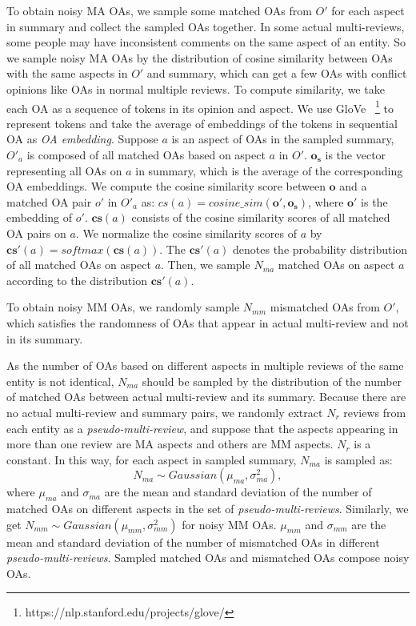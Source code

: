 To obtain noisy MA OAs, 
we sample some matched OAs from $O'$ for each aspect in summary and collect the sampled OAs together.
In some actual multi-reviews, some people may have inconsistent comments on the same aspect of an entity.
So we sample noisy MA OAs by
the distribution of cosine similarity
between OAs with the same aspects in $O'$ and summary,
which can get a few OAs with conflict opinions like OAs in normal multiple reviews.
To compute similarity,
we take each OA as a sequence of tokens in its opinion and aspect.
We use GloVe~\cite{glove}
\footnote{https://nlp.stanford.edu/projects/glove/}
to represent tokens
and take the average of embeddings of the tokens in sequential OA
as {\em OA embedding}.
Suppose $a$ is an aspect of OAs in the sampled summary, 
$O'_a$ is composed of all matched OAs based on aspect $a$ in $O'$.
$\boldsymbol{o_s}$ is the vector representing all OAs on $a$ in summary, 
which is the average of the corresponding OA embeddings.
We compute the cosine similarity score between $\boldsymbol{o}$ and a matched OA pair $o'$ in $O'_a$ as: $cs(a)=cosine\_sim(\boldsymbol{o'}, \boldsymbol{o_s})$,
where $\boldsymbol{o'}$ is the embedding of $o'$.
$\mathbf{cs}(a)$ consists of the cosine similarity scores 
of all matched OA pairs on $a$.
We normalize the cosine similarity scores of $a$
by $\mathbf{cs}'(a)=softmax(\mathbf{cs}(a))$. 
The $\mathbf{cs}'(a)$ denotes the probability distribution 
of all matched OAs on aspect $a$.
Then, we sample $N_{ma}$ matched OAs on aspect $a$ according to the distribution $\mathbf{cs'}(a)$. 

To obtain noisy MM OAs, 
we randomly sample $N_{mm}$ mismatched OAs from $O'$,
which satisfies the randomness
of OAs that appear in actual multi-review 
and not in its summary.

As the number of OAs based on different aspects in multiple reviews of the same entity is not identical,
$N_{ma}$ should be sampled by the distribution of 
the number of matched OAs
between actual multi-review and its summary.
Because there are no actual multi-review and summary pairs,
we randomly extract $N_r$ reviews from each entity
as a {\em pseudo-multi-review}, and suppose that the aspects appearing in more than one review are MA aspects
and others are MM aspects.
$N_r$ is a constant.
In this way, for each aspect in sampled summary, 
$N_{ma}$ is sampled as:
\begin{equation}
N_{ma} \sim Gaussian(\mu_{ma}, \sigma_{ma}^2),
\end{equation}
where $\mu_{ma}$ and $\sigma_{ma}$ are the mean and standard deviation of
the number of matched OAs on different aspects 
in the set of {\em pseudo-multi-reviews}.
Similarly, we get
$N_{mm} \sim Gaussian(\mu_{mm}, \sigma_{mm}^2)$ 
for noisy MM OAs.
$\mu_{mm}$ and $\sigma_{mm}$ are the mean and standard deviation of
the number of mismatched OAs in different {\em pseudo-multi-reviews}.
Sampled matched OAs and mismatched OAs compose noisy OAs.

